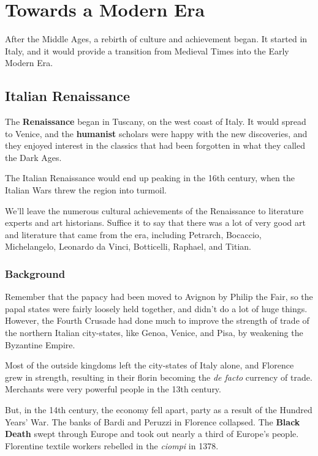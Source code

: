 \chapter{Towards a Modern Era}

After the Middle Ages, a rebirth of culture and achievement began.
It started in Italy, and it would provide a transition from Medieval Times into the Early Modern Era.

\section{Italian Renaissance}

The \textbf{Renaissance} began in Tuscany, on the west coast of Italy.
It would spread to Venice, and the \textbf{humanist} scholars were happy with the new discoveries,
and they enjoyed interest in the classics that had been forgotten in what they called the Dark Ages.

The Italian Renaissance would end up peaking in the 16th century, when the Italian Wars threw the region into turmoil.

We'll leave the numerous cultural achievements of the Renaissance to literature experts and art historians.
Suffice it to say that there was a lot of very good art and literature that came from the era,
including Petrarch, Bocaccio, Michelangelo, Leonardo da Vinci, Botticelli, Raphael, and Titian.

\subsection*{Background}

Remember that the papacy had been moved to Avignon by Philip the Fair,
so the papal states were fairly loosely held together, and didn't do a lot of huge things.
However, the Fourth Crusade had done much to improve the strength of trade of the northern Italian city-states,
like Genoa, Venice, and Pisa, by weakening the Byzantine Empire.

Most of the outside kingdoms left the city-states of Italy alone,
and Florence grew in strength, resulting in their florin becoming the \textit{de facto} currency of trade.
Merchants were very powerful people in the 13th century.

But, in the 14th century, the economy fell apart, party as a result of the Hundred Years' War.
The banks of Bardi and Peruzzi in Florence collapsed.
The \textbf{Black Death} swept through Europe and took out nearly a third of Europe's people.
Florentine textile workers rebelled in the \textit{ciompi} in 1378.

